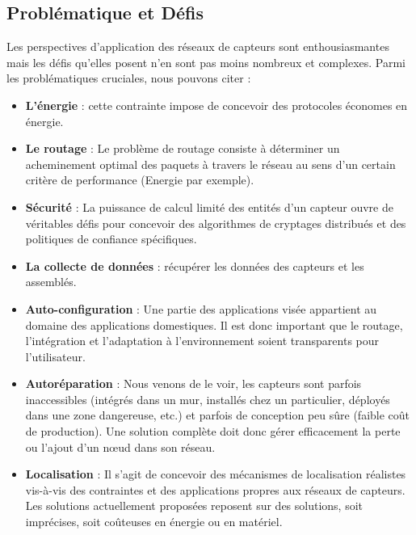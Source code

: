 \subsection{Problématique et Défis}
Les perspectives d’application des réseaux de capteurs sont enthousiasmantes mais les défis qu’elles posent n’en sont pas moins nombreux et complexes. Parmi les problématiques cruciales, nous pouvons citer :
\begin{itemize}

\item \textbf{L’énergie} : cette contrainte impose de concevoir des protocoles économes en énergie.

\item \textbf{Le routage} : Le problème de routage consiste à déterminer un acheminement optimal des paquets à travers le réseau au sens d’un certain critère de performance (Energie par exemple).

\item \textbf{Sécurité} : La puissance de calcul limité des entités d’un capteur ouvre de véritables défis pour concevoir des algorithmes de cryptages distribués et des politiques de confiance spécifiques.

\item \textbf{La collecte de données} : récupérer les données des capteurs et les assemblés.

\item \textbf{Auto-configuration} : Une partie des applications visée appartient au domaine des applications domestiques. Il est donc important que le routage, l’intégration et l’adaptation à l’environnement soient transparents pour l’utilisateur.

\item \textbf{Autoréparation} : Nous venons de le voir, les capteurs sont parfois inaccessibles (intégrés dans un mur, installés chez un particulier, déployés dans une zone dangereuse, etc.) et parfois de conception peu sûre (faible coût de production). Une solution complète doit donc gérer efficacement la perte ou l’ajout d’un nœud dans son réseau.

\item \textbf{Localisation} : Il s’agit de concevoir des mécanismes de localisation réalistes vis-à-vis des contraintes et des applications propres aux réseaux de capteurs. Les solutions actuellement proposées reposent sur des solutions, soit imprécises, soit coûteuses en énergie ou en matériel.

\end{itemize}


